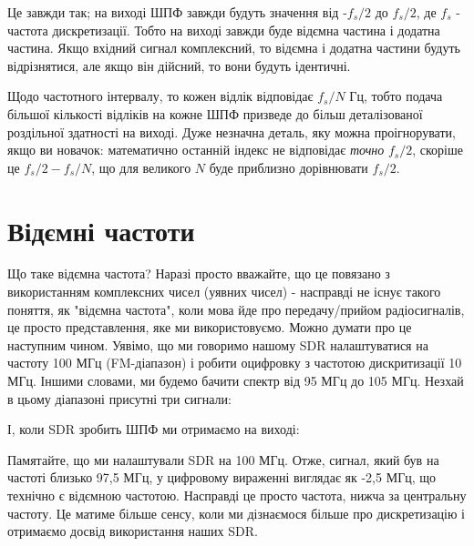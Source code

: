 \href{../_images/negative-frequencies.svg}{}

Це завжди так; на виході ШПФ завжди будуть значення від
\(\text{-} f_s/2\) до \(f_s/2\), де \(f_s\) - частота дискретизації.
Тобто на виході завжди буде від\textquotesingle ємна частина і додатна
частина. Якщо вхідний сигнал комплексний, то від\textquotesingle ємна і
додатна частини будуть відрізнятися, але якщо він дійсний, то вони
будуть ідентичні.

Щодо частотного інтервалу, то кожен відлік відповідає \(f_s/N\) Гц,
тобто подача більшої кількості відліків на кожне ШПФ призведе до більш
деталізованої роздільної здатності на виході. Дуже незначна деталь, яку
можна проігнорувати, якщо ви новачок: математично останній індекс не
відповідає \emph{точно} \(f_s/2\), скоріше це \(f_s/2 - f_s/N\), що для
великого \(N\) буде приблизно дорівнювати \(f_s/2\).

\section{Від\textquotesingle ємні
частоти}\label{ux432ux456ux434ux454ux43cux43dux456-ux447ux430ux441ux442ux43eux442ux438}

Що таке від\textquotesingle ємна частота? Наразі просто вважайте, що це
пов\textquotesingle язано з використанням комплексних чисел (уявних
чисел) - насправді не існує такого поняття, як "від\textquotesingle ємна
частота", коли мова йде про передачу/прийом радіосигналів, це просто
представлення, яке ми використовуємо. Можно думати про це наступним
чином. Уявімо, що ми говоримо нашому SDR налаштуватися на частоту 100
МГц (FM-діапазон) і робити оцифровку з частотою дискритизації 10 МГц.
Іншими словами, ми будемо бачити спектр від 95 МГц до 105 МГц. Незхай в
цьому діапазоні присутні три сигнали:

\href{../_images/negative-frequencies2.svg}{}

І, коли SDR зробить ШПФ ми отримаємо на виході:

\href{../_images/negative-frequencies3.svg}{}

Пам\textquotesingle ятайте, що ми налаштували SDR на 100 МГц. Отже,
сигнал, який був на частоті близько 97,5 МГц, у цифровому вираженні
виглядає як -2,5 МГц, що технічно є від\textquotesingle ємною частотою.
Насправді це просто частота, нижча за центральну частоту. Це матиме
більше сенсу, коли ми дізнаємося більше про дискретизацію і отримаємо
досвід використання наших SDR.

